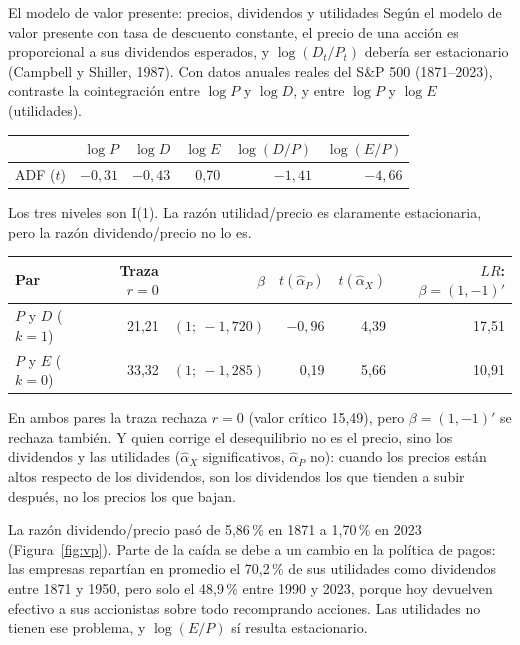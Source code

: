 \begin{ejresuelto}{El modelo de valor presente: precios, dividendos y utilidades}\label{ej:vp}
\enunciado Según el modelo de valor presente con tasa de descuento constante, el precio de una acción es
proporcional a sus dividendos esperados, y $\log(D_t/P_t)$ debería ser estacionario (Campbell y Shiller, 1987).
Con datos anuales reales del S\&P 500 (1871--2023), contraste la cointegración entre $\log P$ y $\log D$, y entre
$\log P$ y $\log E$ (utilidades).

\solucion
{}
\begin{center}\small
\begin{tabular}{@{}lrrrrr@{}}
\toprule
 & $\log P$ & $\log D$ & $\log E$ & $\log(D/P)$ & $\log(E/P)$ \\
\midrule
ADF ($t$) & $-0{,}31$ & $-0{,}43$ & 0,70 & $-1{,}41$ & $-4{,}66$ \\
\bottomrule
\end{tabular}
\end{center}
Los tres niveles son I(1). La razón utilidad/precio es claramente estacionaria, pero la razón dividendo/precio
no lo es.

\begin{center}\small
\begin{tabular}{@{}lrrrrr@{}}
\toprule
Par & Traza $r=0$ & $\hat\beta$ & $t(\hat\alpha_P)$ & $t(\hat\alpha_X)$ & $LR$: $\beta=(1,-1)'$ \\
\midrule
$P$ y $D$ ($k=1$) & 21,21 & $(1;\ -1{,}720)$ & $-0{,}96$ & 4,39 & 17,51 \\
$P$ y $E$ ($k=0$) & 33,32 & $(1;\ -1{,}285)$ & 0,19 & 5,66 & 10,91 \\
\bottomrule
\end{tabular}
\end{center}
En ambos pares la traza rechaza $r=0$ (valor crítico 15,49), pero $\beta=(1,-1)'$ se rechaza también. Y quien
corrige el desequilibrio no es el precio, sino los dividendos y las utilidades ($\hat\alpha_X$ significativos,
$\hat\alpha_P$ no): cuando los precios están altos respecto de los dividendos, son los dividendos los que tienden a
subir después, no los precios los que bajan.

 La razón dividendo/precio pasó de 5,86\,\% en 1871 a
1,70\,\% en 2023 (Figura~\ref{fig:vp}). Parte de la caída se debe a un cambio en la política de pagos: las empresas
repartían en promedio el 70,2\,\% de sus utilidades como dividendos entre 1871 y 1950, pero solo el 48,9\,\% entre
1990 y 2023, porque hoy devuelven efectivo a sus accionistas sobre todo recomprando acciones. Las utilidades no
tienen ese problema, y $\log(E/P)$ sí resulta estacionario.


\end{ejresuelto}

